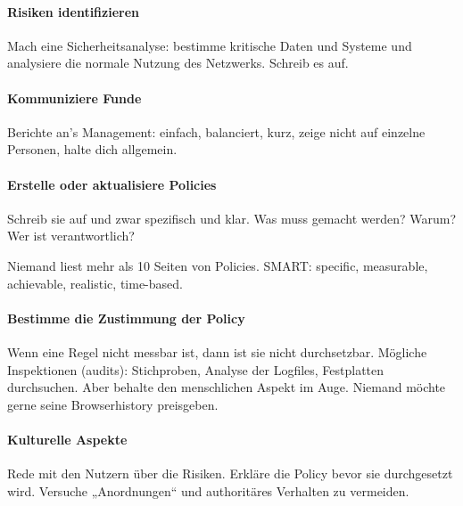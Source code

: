 \paragraph{Risiken identifizieren}%

Mach eine Sicherheitsanalyse: bestimme kritische Daten und Systeme und analysiere die
normale Nutzung des Netzwerks.
Schreib es auf.

\paragraph{Kommuniziere Funde}%

Berichte an’s Management: einfach, balanciert, kurz, zeige nicht auf einzelne Personen,
halte dich allgemein.

\paragraph{Erstelle oder aktualisiere Policies}%

Schreib sie auf und zwar spezifisch und klar.
Was muss gemacht werden?
Warum?
Wer ist verantwortlich?

Niemand liest mehr als 10 Seiten von Policies.
SMART: specific, measurable, achievable, realistic, time-based.

\paragraph{Bestimme die Zustimmung der Policy}%

Wenn eine Regel nicht messbar ist, dann ist sie nicht durchsetzbar.
Mögliche Inspektionen (audits): Stichproben, Analyse der Logfiles, Festplatten
durchsuchen.
Aber behalte den menschlichen Aspekt im Auge.
Niemand möchte gerne seine Browserhistory preisgeben.

\paragraph{Kulturelle Aspekte}%

Rede mit den Nutzern über die Risiken.
Erkläre die Policy bevor sie durchgesetzt wird.
Versuche „Anordnungen“ und authoritäres Verhalten zu vermeiden.

